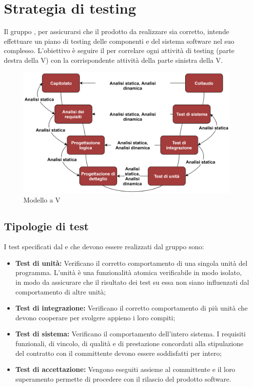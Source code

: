 \section{Strategia di testing}
Il gruppo \Gruppo{}, per assicurarsi che il prodotto da realizzare sia corretto, intende effettuare un piano di testing delle componenti e del sistema software nel suo complesso.
L'obiettivo è seguire il  per correlare ogni attività di testing (parte destra della V) con la corrispondente attività della parte sinistra della V.

\begin{figure}[h]
    \centering
    \includegraphics[scale=0.85]{Sezioni/Immagini/ModelloV.png}
    \caption{Modello a V}
\end{figure}

\subsection{Tipologie di test}
I test specificati dal  e che devono essere realizzati dal gruppo sono:
\begin{itemize}
    \item \textbf{Test di unità:} Verificano il corretto comportamento di una singola unità del programma. L'unità è una funzionalità atomica verificabile in modo isolato, in modo da assicurare che il risultato dei test su essa non siano influenzati dal comportamento di altre unità; 
    \item \textbf{Test di integrazione:} Verificano il corretto comportamento di più unità che devono cooperare per svolgere appieno i loro compiti;
    \item \textbf{Test di sistema:} Verificano il comportamento dell'intero sistema. I requisiti funzionali, di vincolo, di qualità e di prestazione concordati alla stipulazione del contratto con il committente devono essere soddisfatti per intero;
    \item \textbf{Test di accettazione:} Vengono eseguiti assieme al committente e il loro superamento permette di procedere con il rilascio del prodotto software.
\end{itemize}


